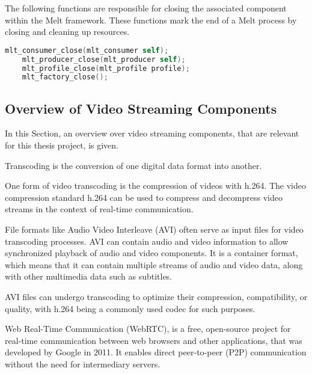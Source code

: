 \documentclass[../MasterThesis.tex]{subfiles}
\begin{document}
\begin{description}[font=\normalfont\color{RedViolet!80!black}, style=nextline]
	The following functions are responsible for closing the associated component within the Melt framework. These functions mark the end of a Melt process by closing and cleaning up resources.
	
	\begin{lstlisting}[language=C, numbers=none, basicstyle=\footnotesize\ttfamily, belowskip=0pt, aboveskip=9pt]
	mlt_consumer_close(mlt_consumer self); 
	mlt_producer_close(mlt_producer self); 
	mlt_profile_close(mlt_profile profile); 
	mlt_factory_close();
	\end{lstlisting}
	
	
\end{description}










\subsection{Overview of Video Streaming Components}
\label{subsection_OverviewVideoStreamingComponents}

In this Section, an overview over video streaming components, that are relevant for this thesis project, is given.

Transcoding is the conversion of one digital data format into another.~\cite{transcoding}

One form of video transcoding is the compression of videos with h.264.
The video compression standard h.264 can be used to compress and decompress video streams in the context of real-time communication.~\cite{transcoding, h264}
	

File formats like Audio Video Interleave (AVI) often serve as input files for video transcoding processes.
AVI can contain audio and video information to allow synchronized playback of audio and video components. 
It is a container format, which means that it can contain multiple streams of audio and video data, along with other multimedia data such as subtitles.~\cite{avi}


AVI files can undergo transcoding to optimize their compression, compatibility, or quality, with h.264 being a commonly used codec for such purposes.~\cite{h264}


Web Real-Time Communication (WebRTC), is a free, open-source project for real-time communication between web browsers and other applications, that was developed by Google in 2011. It enables direct peer-to-peer (P2P) communication without the need for intermediary servers.~\cite{webrtc}
	
\end{document}
